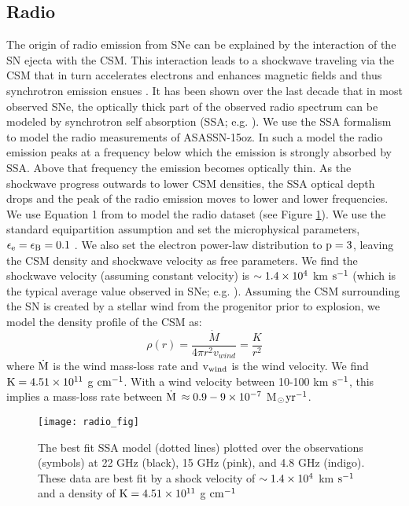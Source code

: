 \documentclass[a4paper,fleqn,usenatbib]{mnras}
\newcommand{\msunperiod}{M$\rm{_{\odot}}$}
\begin{document}
\subsection{Radio}\label{sec:RadioInteraction}
The origin of radio emission from SNe can be explained by the interaction of the SN ejecta with the CSM. 
This interaction leads to a shockwave traveling via the CSM that in turn accelerates electrons and enhances magnetic fields and thus synchrotron emission ensues \citep{1982chevalier,1998chevalier, 2002weiler, 2006chevalier}. 
It has been shown over the last decade that in most observed SNe, the optically thick part of the observed radio spectrum can be modeled by synchrotron self absorption (SSA; e.g. \citealt{2012soderberg, 2013horesh}).
We use the \citet{1998chevalier} SSA formalism to model the radio measurements of ASASSN-15oz.
In such a model the radio emission peaks at a frequency below which the emission is strongly absorbed by SSA. 
Above that frequency the emission becomes optically thin. 
As the shockwave progress outwards to lower CSM densities, the SSA optical depth drops and the peak of the radio emission moves to lower and lower frequencies. 
We use Equation 1 from \citet{1998chevalier} to model the radio dataset (see Figure \ref{fig:radio}).
We use the standard equipartition assumption and set the microphysical parameters, $\rm{\epsilon_{e} = \epsilon_{B}  = 0.1}$ \citep{2006chevalier}. 
We also set the electron power-law distribution to $\rm{p=3}$, leaving the CSM density and shockwave velocity as free parameters. 
We find the shockwave velocity (assuming constant velocity) is $\rm{\sim 1.4\times10^{4}}$ km $\rm{s^{-1}}$ (which is the typical average value observed in SNe; e.g. \citealt{2006chevalier}).
Assuming the CSM surrounding the SN is created by a stellar wind from the progenitor prior to explosion, we model the density profile of the CSM as:
\begin{equation} \label{eqn:density}
\rho(r) = \frac{\dot{M}}{4\pi r^{2}v_{wind}} = \frac{K}{r^{2}}
\end{equation}
where $\rm{\dot{M}}$ is the wind mass-loss rate and $\rm{v_{wind}}$ is the wind velocity.
We find $\rm{K = 4.51\times 10^{11}}$ g $\rm{cm^{-1}}$.
With a wind velocity between 10-100 km $\rm{s^{-1}}$, this implies a mass-loss rate between $\rm{\dot{M}}$ $\rm{\approx 0.9-9\times 10^{-7}}$ \msunperiod $\rm{yr^{-1}}$.
\begin{figure}
\begin{center}
\texttt{[image: radio\_fig]}
\caption{The best fit SSA model (dotted lines) plotted over the observations (symbols) at 22 GHz (black), 15 GHz (pink), and 4.8 GHz (indigo).
These data are best fit by a shock velocity of $\rm{\sim 1.4\times10^{4}}$ km $\rm{s^{-1}}$ and a density of $\rm{K = 4.51\times 10^{11}}$ g $\rm{cm^{-1}}$}
\label{fig:radio}
\end{center}
\end{figure}
\end{document}
